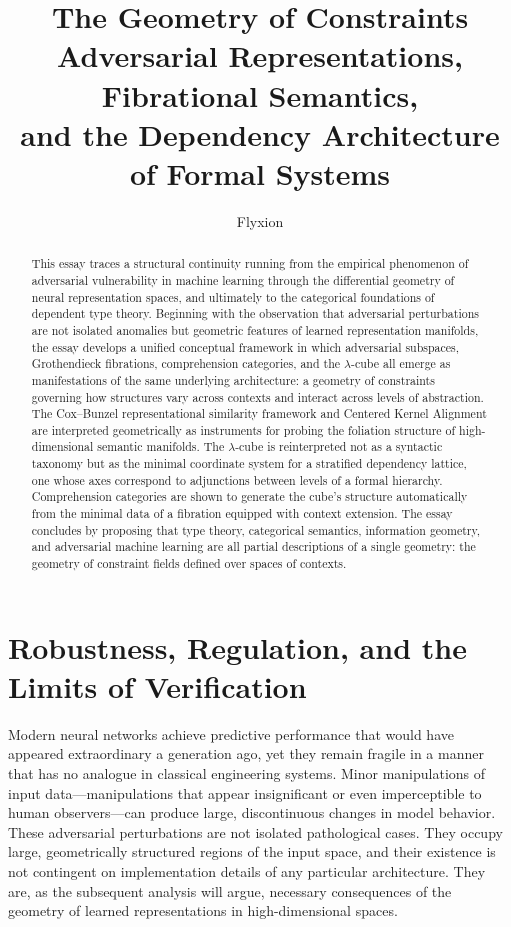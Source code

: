 \documentclass[12pt,a4paper]{article}
\title{\textbf{The Geometry of Constraints}\\[0.6em]
\large Adversarial Representations, Fibrational Semantics,\\
and the Dependency Architecture of Formal Systems}
\author{Flyxion}
\date{}
\theoremstyle{plain}
\theoremstyle{definition}
\begin{document}
\maketitle
\thispagestyle{empty}

\begin{abstract}
This essay traces a structural continuity running from the empirical phenomenon of adversarial vulnerability in machine learning through the differential geometry of neural representation spaces, and ultimately to the categorical foundations of dependent type theory. Beginning with the observation that adversarial perturbations are not isolated anomalies but geometric features of learned representation manifolds, the essay develops a unified conceptual framework in which adversarial subspaces, Grothendieck fibrations, comprehension categories, and the $\lambda$-cube all emerge as manifestations of the same underlying architecture: a geometry of constraints governing how structures vary across contexts and interact across levels of abstraction. The Cox--Bunzel representational similarity framework and Centered Kernel Alignment are interpreted geometrically as instruments for probing the foliation structure of high-dimensional semantic manifolds. The $\lambda$-cube is reinterpreted not as a syntactic taxonomy but as the minimal coordinate system for a stratified dependency lattice, one whose axes correspond to adjunctions between levels of a formal hierarchy. Comprehension categories are shown to generate the cube's structure automatically from the minimal data of a fibration equipped with context extension. The essay concludes by proposing that type theory, categorical semantics, information geometry, and adversarial machine learning are all partial descriptions of a single geometry: the geometry of constraint fields defined over spaces of contexts.
\end{abstract}

\newpage
\tableofcontents
\newpage

\section{Robustness, Regulation, and the Limits of Verification}

Modern neural networks achieve predictive performance that would have appeared extraordinary a generation ago, yet they remain fragile in a manner that has no analogue in classical engineering systems. Minor manipulations of input data---manipulations that appear insignificant or even imperceptible to human observers---can produce large, discontinuous changes in model behavior. These adversarial perturbations are not isolated pathological cases. They occupy large, geometrically structured regions of the input space, and their existence is not contingent on implementation details of any particular architecture. They are, as the subsequent analysis will argue, necessary consequences of the geometry of learned representations in high-dimensional spaces.
\end{document}
